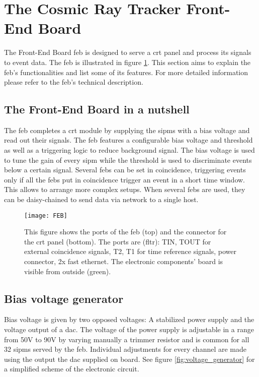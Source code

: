 \section{The Cosmic Ray Tracker Front-End Board}
The Front-End Board \gls{feb} is designed to serve a \gls{crt} panel and process its signals to event data.
The \gls{feb} is illustrated in figure \ref{fig:feb}.
This section aims to explain the \gls{feb}'s functionalities and list some of its features.
For more detailed information please refer to the \gls{feb}'s technical description\cite{Auger:2016vpo}.

\subsection{The Front-End Board in a nutshell}
The \gls{feb} completes a \gls{crt} module by supplying the \glspl{sipm} with a bias voltage and read out their signals.
The \gls{feb} features a configurable bias voltage and threshold as well as a triggering logic to reduce background signal.
The bias voltage is used to tune the gain of every \gls{sipm} while the threshold is used to discriminate events below a certain signal.
Several \glspl{feb} can be set in coincidence, triggering events only if all the \glspl{feb} put in coincidence trigger an event in a short time window.
This allows to arrange more complex setups.
When several \glspl{feb} are used, they can be daisy-chained to send data via network to a single host.

\begin{figure}
  \centering
  \texttt{[image: FEB]}
  \caption{%
    This figure shows the ports of the \gls{feb} (top) and the connector for the \gls{crt} panel (bottom).
    The ports are (fltr): TIN, TOUT for external coincidence signals, T2, T1 for time reference signals, power connector, 2x fast ethernet.
    The electronic components' board is visible from outside (green).
  }
  \label{fig:feb}
\end{figure}

\subsection{Bias voltage generator}
Bias voltage is given by two opposed voltages: A stabilized power supply and the voltage output of a \gls{dac}.
The voltage of the power supply is adjustable in a range from 50V to 90V by varying manually a trimmer resistor and is common for all 32 \glspl{sipm} served by the \gls{feb}.
Individual adjustments for every channel are made using the output the \gls{dac} supplied on board.
See figure \ref{fig:voltage_generator} for a simplified scheme of the electronic circuit.

